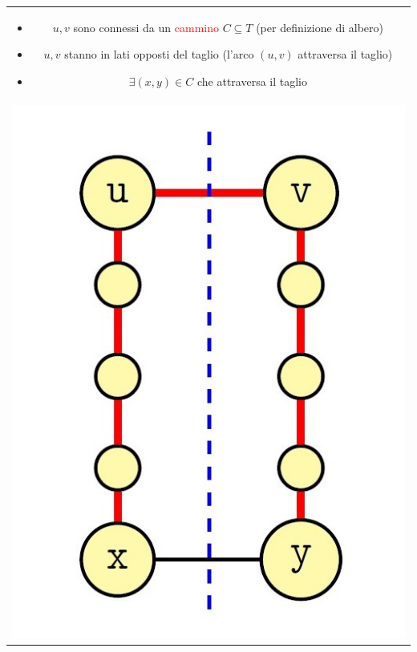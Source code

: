 \documentclass[../cheatSheetAlgoritmi.tex]{subfiles}
\begin{document}
\begin{table}[t]
\begin{tabular}{@{}c@{}}
\begin{minipage}{0.3\textwidth}
\end{minipage}
\hfill
\begin{minipage}{0.6\textwidth}\raggedleft
\begin{itemize}
	\item $u, v$ sono connessi da un \textcolor{red}{cammino} $C \subseteq T$ (per definizione di albero)
	\item $u, v$ stanno in lati opposti del taglio (l'arco $(u, v)$ attraversa il taglio)
	\item $\exists (x, y) \in C$ che attraversa il taglio
\end{itemize}
\end{minipage} \\

\noindent\begin{minipage}{0.3\textwidth}
\includegraphics[width=\linewidth]{../img/Greedy_6.jpg}
\end{minipage}
\hfill
\begin{minipage}{0.6\textwidth}\raggedleft

\end{minipage}
\end{tabular}
\end{table}
\end{document}
